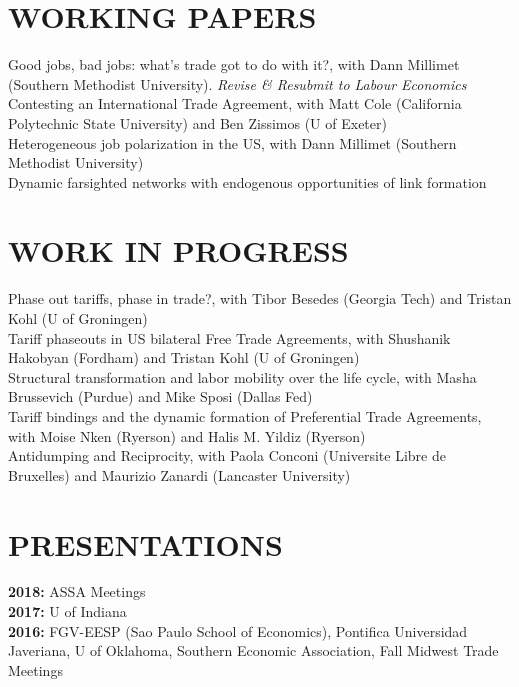 \documentclass[11pt]{res}
\begin{document}
\begin{resume}
\section{WORKING PAPERS}\vspace{1.5mm}
{Good jobs, bad jobs: what's trade got to do with it?}, with Dann Millimet (Southern Methodist University). \emph{Revise \& Resubmit to Labour Economics}\vspace{1.5mm}\\
{Contesting an International Trade Agreement}, with Matt Cole (California Polytechnic State University) and Ben Zissimos (U of Exeter) \vspace{1.5mm}\\
{Heterogeneous job polarization in the US}, with Dann Millimet (Southern Methodist University)\vspace{1.5mm}\\
{Dynamic farsighted networks with endogenous opportunities of link formation} \vspace{1.5mm}\\

\section{WORK IN PROGRESS}\vspace{1.5mm}
Phase out tariffs, phase in trade?, with Tibor Besedes (Georgia Tech) and Tristan Kohl (U of Groningen) \vspace{1.5mm}\\
Tariff phaseouts in US bilateral Free Trade Agreements, with Shushanik Hakobyan (Fordham) and Tristan Kohl (U of Groningen)\vspace{1.5mm}\\
Structural transformation and labor mobility over the life cycle, with Masha Brussevich (Purdue) and Mike Sposi (Dallas Fed)\vspace{1.5mm}\\
Tariff bindings and the dynamic formation of Preferential Trade Agreements, with Moise Nken (Ryerson) and Halis M. Yildiz (Ryerson)\vspace{1.5mm}\\
Antidumping and Reciprocity, with Paola Conconi (Universite Libre de Bruxelles) and Maurizio Zanardi (Lancaster University)\\

\section{PRESENTATIONS}\vspace{1.5mm}
{\bf 2018:} ASSA Meetings \vspace{1.5mm}\\
{\bf 2017:} U of Indiana \vspace{1.5mm}\\
{\bf 2016:} FGV-EESP (Sao Paulo School of Economics), Pontifica Universidad Javeriana, U of Oklahoma, Southern Economic Association, Fall Midwest Trade Meetings\vspace{1.5mm}\\



\end{resume}
\end{document}
